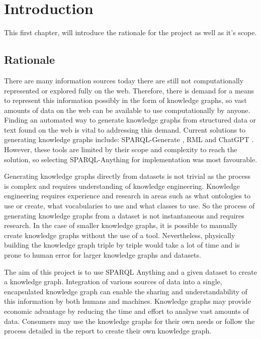 \chapter{Introduction}
This first chapter, will introduce the rationale for the project as well as it's scope. 

\section{Rationale}
There are many information sources today there are still not computationally represented or explored fully on the web. Therefore, there is demand for a means to represent this information possibly in the form of knowledge graphs, so vast amounts of data on the web can be available to use computationally by anyone. Finding an automated way to generate knowledge graphs from structured data or text found on the web is vital to addressing this demand. Current solutions to generating knowledge graphs include: SPARQL-Generate \cite{sparqlgenerate}, RML \cite{rml} and ChatGPT \cite{chatgptwebsite}. However, these tools are limited by their scope and complexity to reach the solution, so selecting SPARQL-Anything \cite{sparqlanythinggithub} for implementation was most favourable. 

Generating knowledge graphs directly from datasets is not trivial as the process is complex and requires understanding of knowledge engineering. Knowledge engineering requires experience and research in areas such as what ontologies to use or create, what vocabularies to use and what classes to use. So the process of generating knowledge graphs from a dataset is not instantaneous and requires research. In the case of smaller knowledge graphs, it is possible to manually create knowledge graphs without the use of a tool. Nevertheless, physically building the knowledge graph triple by triple would take a lot of time and is prone to human error for larger knowledge graphs and datasets. 

The aim of this project is to use SPARQL Anything and a given dataset to create a knowledge graph. Integration of various sources of data into a single, encapsulated knowledge graph can enable the sharing and understandability of this information by both humans and machines. Knowledge graphs may provide economic advantage by reducing the time and effort to analyse vast amounts of data. Consumers may use the knowledge graphs for their own needs or follow the process detailed in the report to create their own knowledge graph. 

